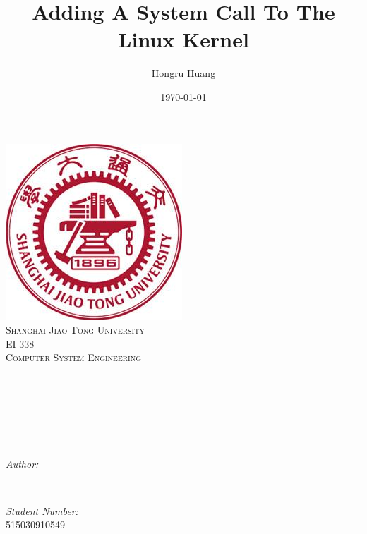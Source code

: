 \documentclass[12pt]{article}
\title{Adding A System Call To The Linux Kernel}								%
\author{Hongru Huang}								%
\date{\today}											%
\makeatletter
\let\thetitle\@title
\let\theauthor\@author
\let\thedate\@date
\makeatother
\begin{document}

\begin{titlepage}
	\centering
    \vspace*{0.5 cm}
    \includegraphics[scale = 0.5]{sjtu_logo.jpg}\\[1.0 cm]	%
    \textsc{\LARGE Shanghai Jiao Tong University}\\[2.0 cm]	%
	\textsc{\Large EI 338}\\[0.5 cm]				%
	\textsc{\large Computer System Engineering}\\[0.5 cm]				%
	\rule{\linewidth}{0.2 mm} \\[0.4 cm]
	{ \huge \bfseries \thetitle}\\
	\rule{\linewidth}{0.2 mm} \\[1.5 cm]
	
	\begin{minipage}{0.4\textwidth}
		\begin{flushleft} \large
			\emph{Author:}\\
			\theauthor
			\end{flushleft}
			\end{minipage}~
			\begin{minipage}{0.4\textwidth}
			\begin{flushright} \large
			\emph{Student Number:} \\
			515030910549									%
		\end{flushright}
	\end{minipage}\\[2 cm]
	
	{\large \thedate}\\[2 cm]
 
	\vfill
	
\end{titlepage}
\end{document}
